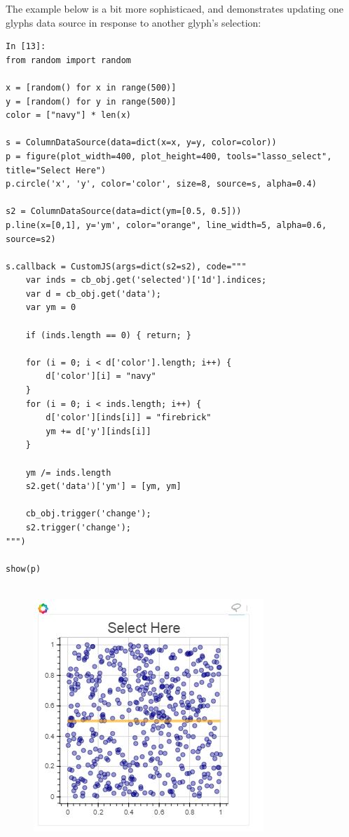 \documentclass[a4paper,12pt]{article}
\begin{document}
The example below is a bit more sophisticaed, and demonstrates updating one glyphs data source in response to another glyph's selection:
\begin{framed}
\begin{verbatim}
In [13]:
from random import random

x = [random() for x in range(500)]
y = [random() for y in range(500)]
color = ["navy"] * len(x)

s = ColumnDataSource(data=dict(x=x, y=y, color=color))
p = figure(plot_width=400, plot_height=400, tools="lasso_select", title="Select Here")
p.circle('x', 'y', color='color', size=8, source=s, alpha=0.4)

s2 = ColumnDataSource(data=dict(ym=[0.5, 0.5]))
p.line(x=[0,1], y='ym', color="orange", line_width=5, alpha=0.6, source=s2)

s.callback = CustomJS(args=dict(s2=s2), code="""
    var inds = cb_obj.get('selected')['1d'].indices;
    var d = cb_obj.get('data');
    var ym = 0
    
    if (inds.length == 0) { return; }
    
    for (i = 0; i < d['color'].length; i++) {
        d['color'][i] = "navy"
    }
    for (i = 0; i < inds.length; i++) {
        d['color'][inds[i]] = "firebrick"
        ym += d['y'][inds[i]]
    }
    
    ym /= inds.length
    s2.get('data')['ym'] = [ym, ym]
    
    cb_obj.trigger('change');
    s2.trigger('change');
""")

show(p)
	
\end{verbatim}
\end{framed}
 
\begin{figure}
\centering
\includegraphics[width=0.7\linewidth]{images/06-interactions-tut-callbacksforselections}
\end{figure}

 
\end{document}
